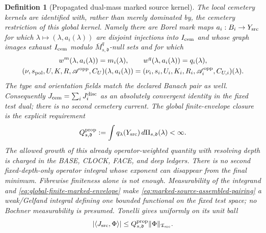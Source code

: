 \documentclass[11pt]{article}
\newtheorem{definition}[theorem]{Definition}
\begin{document}
\begin{definition}[Propagated dual-mass marked source kernel]
The local cemetery kernels are identified with, rather than merely
dominated by, the cemetery restriction of this global kernel.  Namely there
are Borel mark maps $a_i:B_i\to Y_{\rm src}$ for which
$\lambda\mapsto(\lambda,a_i(\lambda))$ are disjoint injections into
$I_{\rm cem}$ and whose graph images exhaust $I_{\rm cem}$ modulo
$\overline M_{s,\mathfrak d}^{q}$-null sets and for which
\begin{equation}
\label{eq:cemetery-global-kernel-identification}
\begin{gathered}
 w^m(\lambda,a_i(\lambda))=m_i(\lambda),\qquad
 w^q(\lambda,a_i(\lambda))=q_i(\lambda),\\
 (\nu,s_{\rm pol},U,K,R,\mathscr A^{\rm opp},C_U)
   (\lambda,a_i(\lambda))
 = (\nu_i,s_i,U_i,K_i,R_i,\mathscr A_i^{\rm opp},C_{U,i})(\lambda).
\end{gathered}
\end{equation}
The type and orientation fields match the declared Banach pair as well.
Consequently $J_{\rm cem}=\sum_iJ_i^{\rm disc}$ as an absolutely convergent
identity in the fixed test dual; there is no second cemetery current.
The global finite-envelope closure is the explicit requirement
\begin{equation}
\label{eq:global-finite-marked-envelope}
 Q_{s,\mathfrak d}^{\rm prop}:=\int q_\lambda(Y_{\rm src})
                  \,d\Pi_{s,\mathfrak d}(\lambda)<\infty.
\end{equation}
The allowed growth of this already operator-weighted quantity with resolving
depth is charged in the BASE, CLOCK, FACE, and deep ledgers.  There is no
second fixed-depth-only operator integral whose exponent can disappear from
the final minimum.  Fibrewise finiteness alone is not enough.  Measurability
of the integrand and
\eqref{eq:global-finite-marked-envelope} make
\eqref{eq:marked-source-assembled-pairing} a weak/Gelfand integral defining
one bounded functional on the fixed test space; no Bochner measurability is
presumed.  Tonelli gives uniformly on its unit ball
\begin{equation}
\label{eq:source-incidence-TV-bound}
 |\langle J_{\rm src},\Phi\rangle|
 \le Q_{s,\mathfrak d}^{\rm prop}\|\Phi\|_{\mathfrak T_{\rm src}}.
\end{equation}


\end{definition}
\end{document}
